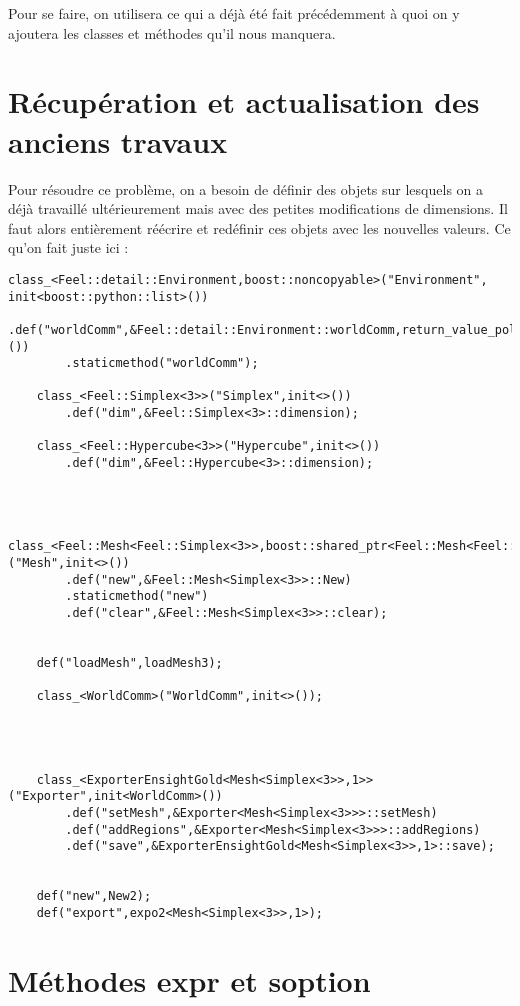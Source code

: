 \documentclass[12pt]{article}
\begin{document}
Pour se faire, on utilisera ce qui a déjà été fait précédemment à quoi on y ajoutera les classes et méthodes qu'il nous manquera.  

\section{Récupération et actualisation des anciens travaux}

Pour résoudre ce problème, on a besoin de définir des objets sur lesquels on a déjà travaillé ultérieurement mais avec des petites modifications de dimensions. Il faut alors entièrement réécrire et redéfinir ces objets avec les nouvelles valeurs.
\vspace{0.5 cm}
Ce qu'on fait juste ici :\\

\begin{lstlisting}
class_<Feel::detail::Environment,boost::noncopyable>("Environment", init<boost::python::list>()) 
        .def("worldComm",&Feel::detail::Environment::worldComm,return_value_policy<copy_non_const_reference>())
        .staticmethod("worldComm");

    class_<Feel::Simplex<3>>("Simplex",init<>())
        .def("dim",&Feel::Simplex<3>::dimension);

    class_<Feel::Hypercube<3>>("Hypercube",init<>())
        .def("dim",&Feel::Hypercube<3>::dimension);



    class_<Feel::Mesh<Feel::Simplex<3>>,boost::shared_ptr<Feel::Mesh<Feel::Simplex<3>>>,boost::noncopyable>("Mesh",init<>())
        .def("new",&Feel::Mesh<Simplex<3>>::New)
        .staticmethod("new")
        .def("clear",&Feel::Mesh<Simplex<3>>::clear);


    def("loadMesh",loadMesh3);

    class_<WorldComm>("WorldComm",init<>());




    class_<ExporterEnsightGold<Mesh<Simplex<3>>,1>>("Exporter",init<WorldComm>())
        .def("setMesh",&Exporter<Mesh<Simplex<3>>>::setMesh) 
        .def("addRegions",&Exporter<Mesh<Simplex<3>>>::addRegions)
        .def("save",&ExporterEnsightGold<Mesh<Simplex<3>>,1>::save);


    def("new",New2); 
    def("export",expo2<Mesh<Simplex<3>>,1>);
\end{lstlisting}

\section{Méthodes expr et soption  }
\end{document}
